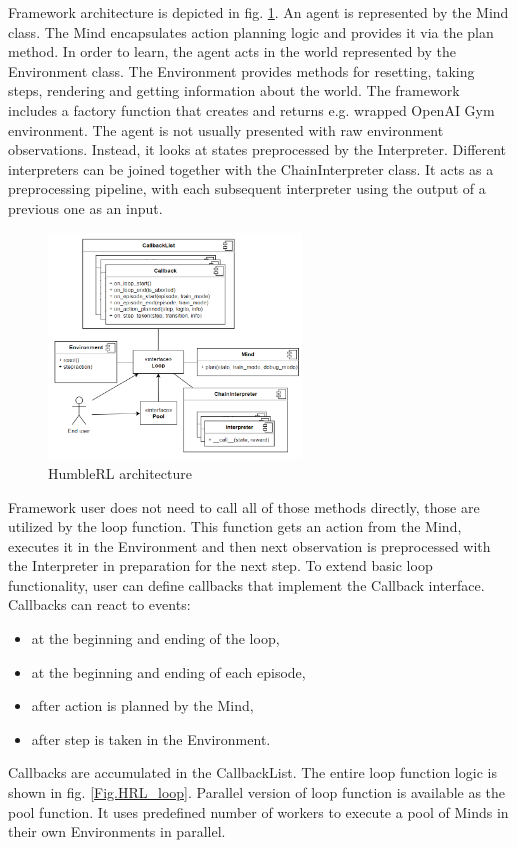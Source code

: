 Framework architecture is depicted in fig. \ref{Fig.HRL_architecture}. An agent is represented by the Mind class. The Mind encapsulates action planning logic and provides it via the plan method. In order to learn, the agent acts in the world represented by the Environment class. The Environment provides methods for resetting, taking steps, rendering and getting information about the world. The framework includes a factory function that creates and returns e.g. wrapped OpenAI Gym environment. The agent is not usually presented with raw environment observations. Instead, it looks at states preprocessed by the Interpreter. Different interpreters can be joined together with the ChainInterpreter class. It acts as a preprocessing pipeline, with each subsequent interpreter using the output of a previous one as an input.

\begin{figure}[H]
\includegraphics[width=0.6\textwidth,keepaspectratio]{figures/HumbleRL/architecture.png}
\caption{HumbleRL architecture}
\label{Fig.HRL_architecture}
\end{figure}

Framework user does not need to call all of those methods directly, those are utilized by the loop function. This function gets an action from the Mind, executes it in the Environment and then next observation is preprocessed with the Interpreter in preparation for the next step. To extend basic loop functionality, user can define callbacks that implement the Callback interface. Callbacks can react to events:
\begin{itemize}
\item at the beginning and ending of the loop,
\item at the beginning and ending of each episode,
\item after action is planned by the Mind,
\item after step is taken in the Environment.
\end{itemize}
Callbacks are accumulated in the CallbackList. The entire loop function logic is shown in fig. \ref{Fig.HRL_loop}.
Parallel version of loop function is available as the pool function. It uses predefined number of workers to execute a pool of Minds in their own Environments in parallel.

